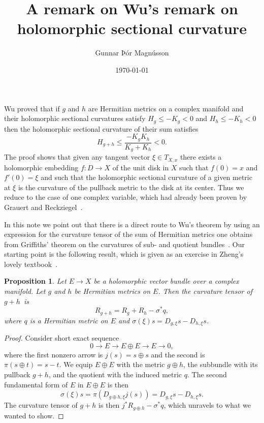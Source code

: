 \documentclass[10pt,a4paper]{amsart}
\author{Gunnar Þór Magnússon}
\date{\today}
\title{A remark on Wu's remark on\\holomorphic sectional curvature}
\newtheorem{prop}[theo]{Proposition}
\begin{document}
\maketitle


Wu \cite{wu1973remark} proved that if $g$ and $h$ are Hermitian metrics on a
complex manifold and their holomorphic sectional curvatures satisfy $H_g \leq
-K_g < 0$ and $H_h \leq -K_h < 0$ then the holomorphic sectional curvature of
their sum satisfies
\[
H_{g + h} \leq \frac{-K_g K_h}{K_g + K_h} < 0.
\]
The proof shows
that given any tangent vector $\xi \in T_{X,x}$ there
exists a holomorphic embedding $f : D \to X$ of the unit disk in $X$ such that
$f(0) = x$ and $f'(0) = \xi$ and such that the holomorphic sectional curvature
of a given metric at $\xi$ is the curvature of the pullback metric
to the disk at its center.
Thus we reduce to the case of one complex variable,
which had already been proven by Grauert and
Reckziegel~\cite{grauert1965hermitesche}.

In this note we point out that there is a direct route to Wu's theorem by using
an expression for the curvature tensor of the sum of Hermitian metrics one
obtains from Griffiths' theorem on the curvatures of sub- and quotient
bundles~\cite{griffiths1965hermitian}. Our starting point is the following
result, which is given as an exercise in Zheng's lovely
textbook~\cite{zheng2000complex}.


\begin{prop}
Let $E \to X$ be a holomorphic vector bundle over a complex manifold.
Let $g$ and $h$ be Hermitian metrics on $E$.
Then the curvature tensor of $g + h$~is%
\[
R_{g + h} = R_g + R_h - \sigma^*q,
\]
where $q$ is a Hermitian metric on $E$ and $\sigma(\xi)s = D_{g,\xi} s -
D_{h,\xi} s$.
\end{prop}


\begin{proof}
Consider short exact sequence
\[
0 \longrightarrow
E \longrightarrow
E \oplus E \longrightarrow
E \longrightarrow
0,
\]
where the first nonzero arrow is $j(s) = s \oplus s$ and the second is $\pi(s
\oplus t) = s - t$.
We equip $E \oplus E$ with the metric $g \oplus h$, the subbundle with its
pullback $g + h$, and the quotient with the induced metric $q$.
The second fundamental form of $E$ in $E \oplus E$ is then
\[
\sigma(\xi) s
= \pi(D_{g \oplus h, \xi} j(s))
= D_{g,\xi}s - D_{h,\xi} s.
\]
The curvature tensor of $g + h$ is then $j^*R_{g \oplus h} - \sigma^* q$, which
unravels to what we wanted to show.
\end{proof}
\end{document}
